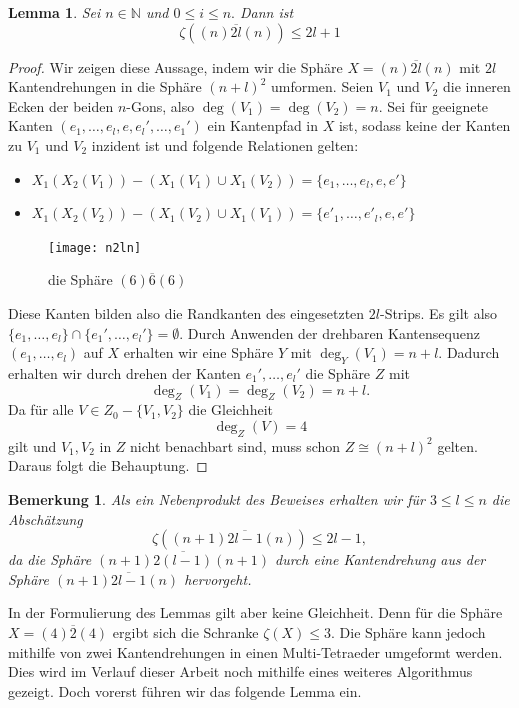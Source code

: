 \documentclass[12pt,titlepage,twoside,cleardoublepage]{article}
\theoremstyle{nummermitklammern}
\newtheorem{lemma}[temp]{Lemma}
\newtheorem{bemerkung}[temp]{Bemerkung}
\newtheorem{lemma}[zahl]{Lemma}
\newtheorem{bemerkung}[zahl]{Bemerkung}
\numberwithin{equation}{section}
\begin{document}
\begin{lemma}
Sei $n\in \mathbb{N}$ und $0\leq i \leq n.$ Dann ist 
\[
\zeta((n)\overline{2l}(n))\leq 2l+1
\]
\end{lemma}
\begin{proof}
Wir zeigen diese Aussage, indem wir die Sphäre $X=(n)\overline{2l}(n)$ mit $2l$ Kantendrehungen in die Sphäre $(n+l)^2$ umformen. Seien $V_1$ und $V_2$ die inneren Ecken der beiden $n$-Gons, also $\deg(V_1)=\deg(V_2)=n$. Sei für geeignete Kanten $(e_1,\ldots,e_l,e,e_l',\ldots,e_1')$ ein Kantenpfad in $X$ ist, sodass keine der Kanten zu $V_1$ und $V_2$ inzident ist und folgende Relationen gelten:
\begin{itemize}
\item $X_1(X_2(V_1))-(X_1(V_1)\cup X_1(V_2))=\{e_1,\ldots,e_l,e,e'\}$
\item $X_1(X_2(V_2))-(X_1(V_2)\cup X_1(V_1))=\{e'_1,\ldots,e'_l,e,e'\}$
\end{itemize}
\begin{figure}[H]
\begin{center}
\texttt{[image: n2ln]}
\end{center}
\caption{die Sphäre $(6)\overline{6}(6)$}
\end{figure}
Diese Kanten bilden also die Randkanten des eingesetzten $2l$-Strips.
Es gilt also $\{e_1,\ldots,e_l\}\cap\{e_1',\ldots,e_l'\}=\emptyset.$
Durch Anwenden der drehbaren Kantensequenz $(e_1,\ldots,e_l)$ auf $X$ erhalten wir eine Sphäre $Y$ mit $\deg_Y(V_1)=n+l.$ Dadurch erhalten wir durch drehen der Kanten $e_1',\ldots,e_l'$ die Sphäre $Z$ mit 
\[
\deg_Z(V_1)=\deg_Z(V_2)=n+l.
\]
Da für alle $V\in Z_0-\{V_1,V_2\}$ die Gleichheit 
\[
\deg_Z(V)=4
\]
gilt und $V_1,V_2$ in $Z$ nicht benachbart sind, muss schon $Z\cong (n+l)^2$ gelten. Daraus folgt die Behauptung.
\end{proof}
\begin{bemerkung}
Als ein Nebenprodukt des Beweises erhalten wir für $3\leq l\leq n$ die Abschätzung 
\[
\zeta((n+1)\overline{2l-1}(n))\leq 2l-1,
\]
da die Sphäre $(n+1)\overline{2(l-1)}(n+1)$ durch eine Kantendrehung aus der Sphäre $(n+1)\overline{2l-1}(n)$ hervorgeht.
\end{bemerkung}
In der Formulierung des Lemmas gilt aber keine Gleichheit.
Denn für die Sphäre $X=(4)\overline{2}(4)$ ergibt sich die Schranke $\zeta(X)\leq 3.$ Die Sphäre kann jedoch mithilfe von zwei Kantendrehungen in einen Multi-Tetraeder umgeformt werden. Dies wird im Verlauf dieser Arbeit noch mithilfe eines weiteres Algorithmus gezeigt. Doch vorerst führen wir das folgende Lemma ein.
\end{document}
